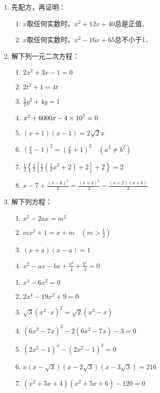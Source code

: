 \begin{enumerate}
\item 先配方，再证明：
\begin{enumerate}
    \item $x$取任何实数时，$x^2+12x+40$总是正值．
    \item $x$取任何实数时，$x^2-16x+65$总不小于1．
\end{enumerate}

\item 解下列一元二次方程：
\begin{enumerate}
    \item $2x^2+3x-1=0$
    \item $2t^2+1=4t$
    \item $\frac{3}{2}y^2+4y=1$
    \item $x^2+6000x-4\times 10^7=0$
    \item $(x+1)(x-1)=2\sqrt{2}x$
    \item $\left(\frac{x}{a}-1\right)^2=\left(\frac{x}{b}+1\right)^2\quad (a^2\ne b^2)$
    \item $\frac{1}{2}\left\{\frac{1}{2}\left[\frac{1}{2}\left(\frac{1}{2}x^2+2\right)+2\right]+2\right\}=2$
    \item $x-7+\frac{(x-6)^2}{2}=\frac{(x+4)^2}{2}-\frac{(x+2)(x+6)}{2}$
\end{enumerate}

\item 解下列方程：
\begin{enumerate}
    \item $x^2-2ax=m^2$
    \item $mx^2+1=x+m\quad (m>\frac{1}{2})$
    \item $(x+a)(x-a)=1$
    \item $x^2-ax-bx+\frac{a^2}{4}+\frac{b^2}{4}=0$
\end{enumerate}

\begin{enumerate}
    \item $x^4-6x^2=0$
    \item $2x^4-19x^2+9=0$
    \item $\sqrt{3}(x^2\cdot x)^2=\sqrt{2}(x^2-x)$
    \item $(6x^2-7x)^2-2(6x^2-7x)-3=0$
    \item $(2x^2-1)^4-(2x^2-1)^2=0$
    \item $x\left(x-\sqrt{3}\right)\left(x-2\sqrt{3}\right)\left(x-3\sqrt{3}\right)=216$
    \item $(x^2+5x+4)(x^2+5x+6)-120=0$
\end{enumerate}


\end{enumerate}
